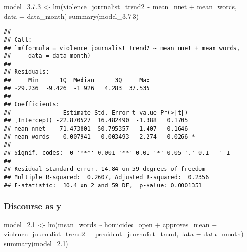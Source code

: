 \documentclass[
]{article}
\newenvironment{Shaded}{\begin{snugshade}}{\end{snugshade}}
\newcommand{\AttributeTok}[1]{\textcolor[rgb]{0.77,0.63,0.00}{#1}}
\newcommand{\FloatTok}[1]{\textcolor[rgb]{0.00,0.00,0.81}{#1}}
\newcommand{\FunctionTok}[1]{\textcolor[rgb]{0.00,0.00,0.00}{#1}}
\newcommand{\NormalTok}[1]{#1}
\newcommand{\OtherTok}[1]{\textcolor[rgb]{0.56,0.35,0.01}{#1}}
\newcommand{\SpecialCharTok}[1]{\textcolor[rgb]{0.00,0.00,0.00}{#1}}
\begin{document}
\begin{Shaded}
\begin{Highlighting}[]
\NormalTok{model\_3.}\FloatTok{7.3} \OtherTok{\textless{}{-}} \FunctionTok{lm}\NormalTok{(violence\_journalist\_trend2 }\SpecialCharTok{\textasciitilde{}}\NormalTok{ mean\_nnet }\SpecialCharTok{+}\NormalTok{ mean\_words, }\AttributeTok{data =}\NormalTok{ data\_month)}
\FunctionTok{summary}\NormalTok{(model\_3.}\FloatTok{7.3}\NormalTok{)}
\end{Highlighting}
\end{Shaded}

\begin{verbatim}
## 
## Call:
## lm(formula = violence_journalist_trend2 ~ mean_nnet + mean_words, 
##     data = data_month)
## 
## Residuals:
##     Min      1Q  Median      3Q     Max 
## -29.236  -9.426  -1.926   4.283  37.535 
## 
## Coefficients:
##               Estimate Std. Error t value Pr(>|t|)  
## (Intercept) -22.870527  16.482490  -1.388   0.1705  
## mean_nnet    71.473801  50.795357   1.407   0.1646  
## mean_words    0.007941   0.003493   2.274   0.0266 *
## ---
## Signif. codes:  0 '***' 0.001 '**' 0.01 '*' 0.05 '.' 0.1 ' ' 1
## 
## Residual standard error: 14.84 on 59 degrees of freedom
## Multiple R-squared:  0.2607, Adjusted R-squared:  0.2356 
## F-statistic:  10.4 on 2 and 59 DF,  p-value: 0.0001351
\end{verbatim}

\hypertarget{discourse-as-y}{%
\subsubsection{Discourse as y}\label{discourse-as-y}}

\begin{Shaded}
\begin{Highlighting}[]
\NormalTok{model\_2}\FloatTok{.1} \OtherTok{\textless{}{-}} \FunctionTok{lm}\NormalTok{(mean\_words }\SpecialCharTok{\textasciitilde{}}\NormalTok{ homicides\_open }\SpecialCharTok{+}\NormalTok{ approves\_mean }\SpecialCharTok{+}\NormalTok{ violence\_journalist\_trend2 }\SpecialCharTok{+}\NormalTok{ president\_journalist\_trend, }\AttributeTok{data =}\NormalTok{ data\_month)}
\FunctionTok{summary}\NormalTok{(model\_2}\FloatTok{.1}\NormalTok{)}
\end{Highlighting}
\end{Shaded}
\end{document}
